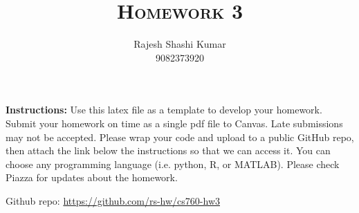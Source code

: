 \documentclass[a4paper]{article}
\title{\textsc{Homework 3}} %
\author{
Rajesh Shashi Kumar \\
9082373920\\
}
\date{}
\theoremstyle{definition}
\newenvironment{soln}{
    \leavevmode\color{blue}\ignorespaces
}{}
\begin{document}
\maketitle 


\textbf{Instructions:} 
Use this latex file as a template to develop your homework. Submit your homework on time as a single pdf file to Canvas. Late submissions may not be accepted. Please wrap your code and upload to a public GitHub repo, then attach the link below the instructions so that we can access it. You can choose any programming language (i.e. python, R, or MATLAB). Please check Piazza for updates about the homework.

\begin{soln}
    Github repo: \url{https://github.com/rs-hw/cs760-hw3}
\end{soln}
\end{document}
